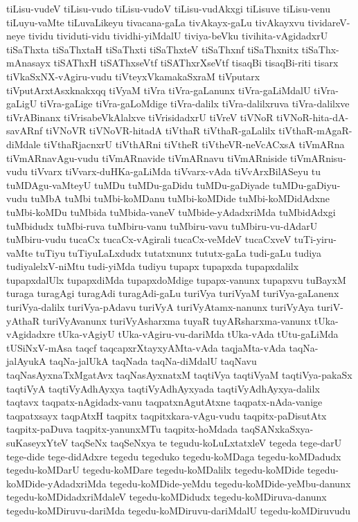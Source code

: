 {tiLisu-vudeV
tiLisu-vudo
tiLisu-vudoV
tiLisu-vudAkxgi
tiLisuve
tiLisu-venu
tiLuyu-vaMte
tiLuvaLikeyu
tivacana-gaLa
tivAkayx-gaLu
tivAkayxvu
tividareV-neye
tividu
tividuti-vidu
tividhi-yiMdalU
tiviya-beVku
tivihita-vAgidadxrU
tiSaThxta
tiSaThxtaH
tiSaThxti
tiSaThxteV
tiSaThxnf
tiSaThxnitx
tiSaThx-mAnasayx
tiSAThxH
tiSAThxseVtf
tiSAThxrXseVtf
tisaqBi
tisaqBi-riti
tisarx
tiVkaSxNX-vAgiru-vudu
tiVteyxVkamakaSxraM
tiVputarx
tiVputArxtAsxknakxqq
tiVyaM
tiVra
tiVra-gaLanunx
tiVra-gaLiMdalU
tiVra-gaLigU
tiVra-gaLige
tiVra-gaLoMdige
tiVra-dalilx
tiVra-dalilxruva
tiVra-dalilxve
tiVrABinanx
tiVrisabeVkAlalxve
tiVrisidadxrU
tiVreV
tiVNoR
tiVNoR-hita-dA-savARnf
tiVNoVR
tiVNoVR-hitadA
tiVthaR
tiVthaR-gaLalilx
tiVthaR-mAgaR-diMdale
tiVthaRjacnxrU
tiVthARni
tiVtheR
tiVtheVR-neVcACxsA
tiVmARna
tiVmARnavAgu-vudu
tiVmARnavide
tiVmARnavu
tiVmARniside
tiVmARnisu-vudu
tiVvarx
tiVvarx-duHKa-gaLiMda
tiVvarx-vAda
tiVvArxBilASeyu
tu
tuMDAgu-vaMteyU
tuMDu
tuMDu-gaDidu
tuMDu-gaDiyade
tuMDu-gaDiyu-vudu
tuMbA
tuMbi
tuMbi-koMDanu
tuMbi-koMDide
tuMbi-koMDidAdxne
tuMbi-koMDu
tuMbida
tuMbida-vaneV
tuMbide-yAdadxriMda
tuMbidAdxgi
tuMbidudx
tuMbi-ruva
tuMbiru-vanu
tuMbiru-vavu
tuMbiru-vu-dAdarU
tuMbiru-vudu
tucaCx
tucaCx-vAgirali
tucaCx-veMdeV
tucaCxveV
tuTi-yiru-vaMte
tuTiyu
tuTiyuLaLxdudx
tutatxnunx
tututx-gaLa
tudi-gaLu
tudiya
tudiyalelxV-niMtu
tudi-yiMda
tudiyu
tupapx
tupapxda
tupapxdalilx
tupapxdalUlx
tupapxdiMda
tupapxdoMdige
tupapx-vanunx
tupapxvu
tuBayxM
turaga
turagAgi
turagAdi
turagAdi-gaLu
turiVya
turiVyaM
turiVya-gaLanenx
turiVya-dalilx
turiVya-pAdavu
turiVyA
turiVyAtamx-nanunx
turiVyAya
turiV-yAthaR
turiVyAvanunx
turiVyAsharxma
tuyaR
tuyARsharxma-vanunx
tUka-vAgidadxre
tUka-vAgiyU
tUka-vAgiru-vu-dariMda
tUka-vAda
tUtu-gaLiMda
tUSiNxV-mAsa
taqcf
taqcapxrXtayxyAMta-vAda
taqjaMta-vAda
taqNa-jalAyukA
taqNa-jalUkA
taqNada
taqNa-diMdalU
taqNavu
taqNasAyxnaTxMgatAvx
taqNasAyxnatxM
taqtiVya
taqtiVyaM
taqtiVya-pakaSx
taqtiVyA
taqtiVyAdhAyxya
taqtiVyAdhAyxyada
taqtiVyAdhAyxya-dalilx
taqtavx
taqpatx-nAgidadx-vanu
taqpatxnAgutAtxne
taqpatx-nAda-vanige
taqpatxsayx
taqpAtxH
taqpitx
taqpitxkara-vAgu-vudu
taqpitx-paDisutAtx
taqpitx-paDuva
taqpitx-yanunxMTu
taqpitx-hoMdada
taqSANxkaSxya-suKaseyxYteV
taqSeNx
taqSeNxya
te
tegudu-koLuLxtatxleV
tegeda
tege-darU
tege-dide
tege-didAdxre
tegedu
tegeduko
tegedu-koMDaga
tegedu-koMDadudx
tegedu-koMDarU
tegedu-koMDare
tegedu-koMDalilx
tegedu-koMDide
tegedu-koMDide-yAdadxriMda
tegedu-koMDide-yeMdu
tegedu-koMDide-yeMbu-danunx
tegedu-koMDidadxriMdaleV
tegedu-koMDidudx
tegedu-koMDiruva-danunx
tegedu-koMDiruvu-dariMda
tegedu-koMDiruvu-dariMdalU
tegedu-koMDiruvudu
}
